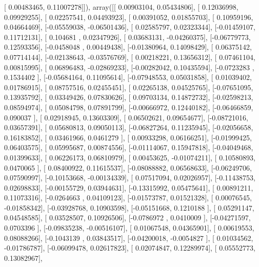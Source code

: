 \documentclass{article}
\begin{document}
       [ 0.00483465,  0.11007278]]), array([[ 0.00903104,  0.05434806],
       [ 0.12036998,  0.09929255],
       [ 0.02257541,  0.04493923],
       [ 0.00391052,  0.01855703],
       [ 0.10959196,  0.04664469],
       [-0.05559038, -0.06501436],
       [ 0.02585797,  0.02323344],
       [-0.01459107,  0.11712131],
       [ 0.104681  ,  0.02347926],
       [ 0.03683131, -0.04260375],
       [-0.06779773,  0.12593356],
       [-0.0458048 ,  0.00449438],
       [-0.01380964,  0.14098429],
       [ 0.06375142,  0.07714144],
       [-0.02138643, -0.03576769],
       [ 0.00218221,  0.13656312],
       [ 0.07461104,  0.00815995],
       [ 0.06896483, -0.02869233],
       [-0.00282042,  0.10435594],
       [-0.0723283 ,  0.1534402 ],
       [-0.05684164,  0.11095614],
       [-0.07948553,  0.05031858],
       [ 0.01039402,  0.01786915],
       [ 0.08757516,  0.02455451],
       [ 0.02265138,  0.04525765],
       [-0.07651095,  0.13935792],
       [ 0.03349426,  0.07830626],
       [ 0.09703134,  0.14872732],
       [-0.02598213,  0.08594974],
       [ 0.05084798,  0.07891799],
       [-0.00666972,  0.12440182],
       [-0.06466859,  0.090037  ],
       [ 0.02918945,  0.13603309],
       [ 0.06502621,  0.09654677],
       [-0.08721016,  0.03657391],
       [ 0.05680813,  0.09050113],
       [-0.06827264,  0.11235945],
       [-0.02056658,  0.16183852],
       [ 0.03461966,  0.0461279 ],
       [ 0.00933298,  0.06166251],
       [-0.01999425,  0.06403575],
       [ 0.05995687,  0.00874556],
       [-0.01114067,  0.15947818],
       [-0.04049468,  0.01399633],
       [ 0.06226173,  0.06810979],
       [ 0.00453625, -0.01074211],
       [ 0.10580893,  0.0470065 ],
       [ 0.08400922,  0.11615537],
       [-0.08088882,  0.06568633],
       [-0.06249706,  0.07590997],
       [-0.10153668, -0.00134339],
       [ 0.07517094,  0.02026957],
       [-0.11438753,  0.02698833],
       [-0.00155729,  0.03944631],
       [-0.13315992,  0.05475641],
       [ 0.00891211,  0.11073316],
       [-0.0264663 ,  0.04109123],
       [-0.01573787,  0.01521328],
       [ 0.00076545, -0.01858342],
       [-0.03928768,  0.10903598],
       [-0.05151668,  0.1210188 ],
       [ 0.05291147,  0.04548585],
       [ 0.03528507,  0.10926506],
       [-0.0786972 ,  0.0410009 ],
       [-0.04271597,  0.0703396 ],
       [-0.09835238, -0.00516107],
       [ 0.01067548,  0.04365901],
       [ 0.00619553,  0.08088266],
       [-0.1043139 ,  0.03843517],
       [-0.04200018, -0.0054827 ],
       [ 0.01034562, -0.01786787],
       [-0.06099478,  0.02617823],
       [ 0.02074847,  0.12289974],
       [ 0.05552773,  0.13082967],
\end{document}
